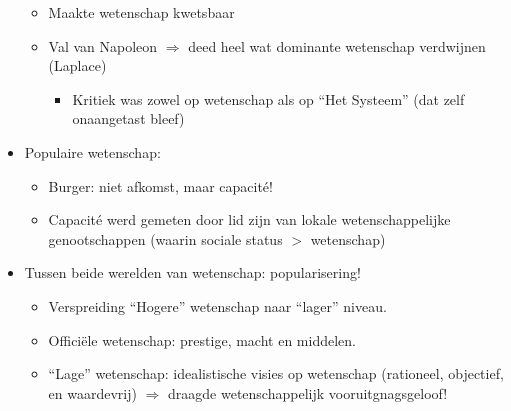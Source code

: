 \documentclass{article}
\begin{document}
\begin{itemize}
      \begin{itemize}
        \item Maakte wetenschap kwetsbaar
        \item Val van Napoleon $\Rightarrow$ deed heel wat dominante wetenschap verdwijnen (Laplace)
        \begin{itemize}
          \item Kritiek was zowel op wetenschap als op ``Het Systeem'' (dat zelf onaangetast bleef)
        \end{itemize}
      \end{itemize}
      \item Populaire wetenschap:
      \begin{itemize}
        \item Burger: niet afkomst, maar capacit\'e!
        \item Capacit\'e werd gemeten door lid zijn van lokale wetenschappelijke genootschappen (waarin sociale status $>$ wetenschap)
      \end{itemize}
      \item Tussen beide werelden van wetenschap: popularisering!
      \begin{itemize}
        \item Verspreiding ``Hogere'' wetenschap naar ``lager'' niveau.
        \item Offici\"ele wetenschap: prestige, macht en middelen.
        \item ``Lage'' wetenschap: idealistische visies op wetenschap (rationeel, objectief, en waardevrij) $\Rightarrow$ draagde wetenschappelijk vooruitgnagsgeloof!
      \end{itemize}
    \end{itemize}

  \newpage
\end{document}
